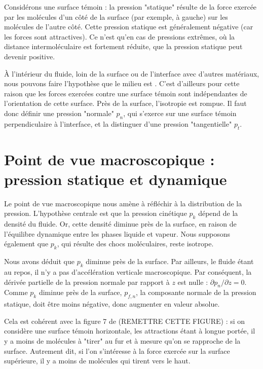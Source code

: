 Considérons une surface témoin : la pression "statique" résulte de la force exercée par les molécules d'un côté de la surface (par exemple, à gauche) sur les molécules de l'autre côté. Cette pression statique est généralement négative (car les forces sont attractives). Ce n’est qu’en cas de pressions extrêmes, où la distance intermoléculaire est fortement réduite, que la pression statique peut devenir positive.

À l'intérieur du fluide, loin de la surface ou de l'interface avec d'autres matériaux, nous pouvons faire l'hypothèse que le milieu est . C'est d'ailleurs pour cette raison que les forces exercées contre une surface témoin sont indépendantes de l'orientation de cette surface. Près de la surface, l'isotropie est rompue. Il faut donc définir une pression "normale" $p_n$, qui s'exerce sur une surface témoin perpendiculaire à l'interface, et la distinguer d'une pression "tangentielle" $p_t$.

\section{Point de vue macroscopique : pression statique et dynamique}

Le point de vue macroscopique nous amène à réfléchir à la distribution de la pression. L’hypothèse centrale est que la pression cinétique $p_k$ dépend de la densité du fluide. Or, cette densité diminue près de la surface, en raison de l’équilibre dynamique entre les phases liquide et vapeur. Nous supposons également que $p_k$, qui résulte des chocs moléculaires, reste isotrope.

Nous avons déduit que $p_k$ diminue près de la surface. Par ailleurs, le fluide étant au repos, il n’y a pas d’accélération verticale macroscopique. Par conséquent, la dérivée partielle de la pression normale par rapport à $z$ est nulle : $\partial p_n / \partial z = 0$. Comme $p_k$ diminue près de la surface, $p_{f,n}$, la composante normale de la pression statique, doit être moins négative, donc augmenter en valeur absolue.

Cela est cohérent avec la figure 7 de \cite{marchand11aa} (REMETTRE CETTE FIGURE) : si on considère une surface témoin horizontale, les attractions étant à longue portée, il y a moins de molécules à "tirer" au fur et à mesure qu'on se rapproche de la surface. Autrement dit, si l'on s'intéresse à la force exercée sur la surface supérieure, il y a moins de molécules qui tirent vers le haut.

